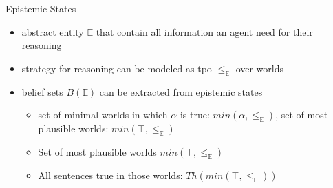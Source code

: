 \documentclass[12pt, notheorems]{beamer}
\theoremstyle{definition}
\theoremstyle{example}
\theoremstyle{plain}
\begin{document}
\begin{frame}{Epistemic States}
    \begin{itemize}
        \item abstract entity $\mathbb{E}$ that contain all information an agent need for their reasoning \cite{Darwiche1997}
        \item strategy for reasoning can be modeled as tpo $\leq_{\mathbb{E}}$ over worlds
        \item belief sets $B(\mathbb{E})$ can be extracted from epistemic states
              \begin{itemize}
                  \item set of minimal worlds in which $\alpha$ is true: $min(\alpha, \leq_{\mathbb{E}})$, set of most plausible worlds:  $min(\top, \leq_{\mathbb{E}})$
                  \item Set of most plausible worlds $min(\top, \leq_{\mathbb{E}})$
                  \item All sentences true in those worlds: $Th(min(\top, \leq_{\mathbb{E}}))$
              \end{itemize}
    \end{itemize}

\end{frame}
\end{document}
